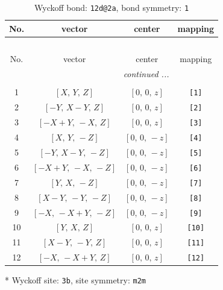 \documentclass[fleqn,8pt]{jsarticle}
\begin{document}
\begin{longtable}{cccc}
\caption{Wyckoff bond: {\tt 12d@2a}, bond symmetry: {\tt 1}}
 \\
 \hline \hline
No. & vector & center & mapping \\ \hline \endfirsthead

\multicolumn{3}{l}{\tablename\ \thetable{}} \\
 \hline \hline
No. & vector & center & mapping \\ \hline \endhead

 \hline \hline
\multicolumn{3}{r}{\footnotesize\it continued ...} \\ \endfoot

 \hline \hline
\multicolumn{3}{r}{} \\ \endlastfoot

1 & $\left[ X,\, Y,\, Z \right]$ & $\left[ 0,\, 0,\, z \right]$ & {\tt [1]} \\ \hline
2 & $\left[ - Y,\, X - Y,\, Z \right]$ & $\left[ 0,\, 0,\, z \right]$ & {\tt [2]} \\ \hline
3 & $\left[ - X + Y,\, - X,\, Z \right]$ & $\left[ 0,\, 0,\, z \right]$ & {\tt [3]} \\ \hline
4 & $\left[ X,\, Y,\, - Z \right]$ & $\left[ 0,\, 0,\, - z \right]$ & {\tt [4]} \\ \hline
5 & $\left[ - Y,\, X - Y,\, - Z \right]$ & $\left[ 0,\, 0,\, - z \right]$ & {\tt [5]} \\ \hline
6 & $\left[ - X + Y,\, - X,\, - Z \right]$ & $\left[ 0,\, 0,\, - z \right]$ & {\tt [6]} \\ \hline
7 & $\left[ Y,\, X,\, - Z \right]$ & $\left[ 0,\, 0,\, - z \right]$ & {\tt [7]} \\ \hline
8 & $\left[ X - Y,\, - Y,\, - Z \right]$ & $\left[ 0,\, 0,\, - z \right]$ & {\tt [8]} \\ \hline
9 & $\left[ - X,\, - X + Y,\, - Z \right]$ & $\left[ 0,\, 0,\, - z \right]$ & {\tt [9]} \\ \hline
10 & $\left[ Y,\, X,\, Z \right]$ & $\left[ 0,\, 0,\, z \right]$ & {\tt [10]} \\ \hline
11 & $\left[ X - Y,\, - Y,\, Z \right]$ & $\left[ 0,\, 0,\, z \right]$ & {\tt [11]} \\ \hline
12 & $\left[ - X,\, - X + Y,\, Z \right]$ & $\left[ 0,\, 0,\, z \right]$ & {\tt [12]} \\
\end{longtable}
* Wyckoff site: {\tt 3b}, site symmetry: {\tt m2m}
\renewcommand{\arraystretch}{1.2}
\end{document}
